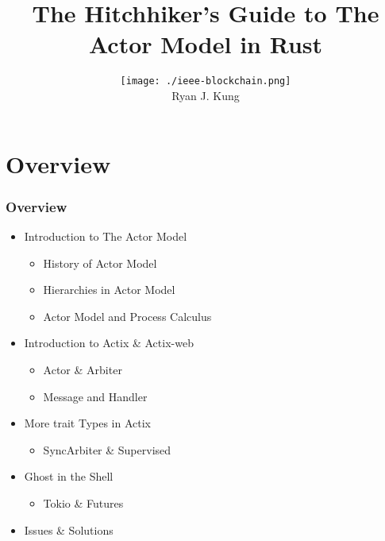 \documentclass[notheorems, aspectratio=54]{beamer}
\title[Actor Model]{The Hitchhiker's Guide to The Actor Model in Rust}
\author[Ryan Kung]{\texttt{[image: ./ieee-blockchain.png]} \\ Ryan J. Kung}
\institute[IEEE Blockchain]{ryankung@ieee.org}
\begin{document}
\begin{frame}
    \titlepage
\end{frame}

\section{Overview}

\begin{frame}
  \frametitle{Overview}
  \begin{itemize}
  \item Introduction to The Actor Model
     \begin{itemize}
     \item History of Actor Model
     \item Hierarchies in Actor Model
     \item Actor Model and Process Calculus
     \end{itemize}
   \item Introduction to Actix \& Actix-web
     \begin{itemize}
     \item Actor \& Arbiter
     \item Message and Handler
    \end{itemize}
    \item More trait Types in Actix
    \begin{itemize}
      \item SyncArbiter \& Supervised
    \end{itemize}
    \item Ghost in the Shell
    \begin{itemize}
      \item Tokio \& Futures
    \end{itemize}
  \item Issues \& Solutions
\end{itemize}
\end{frame}
\end{document}
